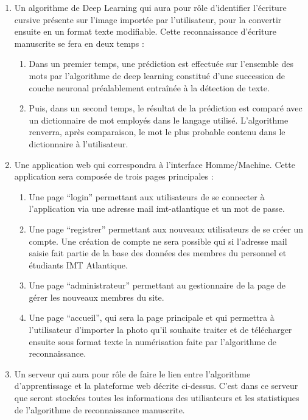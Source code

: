 \documentclass[oneside,a4paper,13pt]{article}
\begin{document}
\begin{enumerate}
    \item Un algorithme de Deep Learning qui aura pour rôle d’identifier l’écriture cursive présente sur l’image importée par l’utilisateur, pour la convertir ensuite en un format texte modifiable. Cette reconnaissance d’écriture manuscrite se fera en deux temps : 
    \begin{enumerate}
        \item Dans un premier temps, une prédiction est effectuée sur l'ensemble des mots par l'algorithme de deep learning constitué d'une succession de couche neuronal préalablement entraînée à la détection de texte.
        \item Puis, dans un second temps, le résultat de la prédiction est comparé avec un dictionnaire de mot employés dans le langage utilisé. L'algorithme renverra, après comparaison, le mot le plus probable contenu dans le dictionnaire à l'utilisateur.   
    \end{enumerate}
    
    \item Une application web qui correspondra à l’interface Homme/Machine. Cette application sera composée  de trois pages principales :
    \begin{enumerate}
        \item Une page “login” permettant aux utilisateurs de se connecter à l’application via une adresse mail imt-atlantique et un mot de passe. 
        \item Une page “registrer” permettant aux nouveaux utilisateurs de se créer un compte. Une création de compte ne sera possible qui si l’adresse mail saisie fait partie de la base des données des membres du personnel et étudiants IMT Atlantique.
        \item Une page “administrateur” permettant au gestionnaire de la page de gérer les nouveaux membres du site. 
        \item Une page “accueil”, qui sera la page principale et qui permettra à l’utilisateur d’importer la photo qu’il souhaite traiter et de télécharger ensuite sous format texte la numérisation faite par l’algorithme de reconnaissance. 
    \end{enumerate}
    
    \item Un serveur qui aura pour rôle de faire le lien entre l’algorithme d’apprentissage et la plateforme web décrite ci-dessus. C’est dans ce serveur que seront stockées toutes les informations des utilisateurs et les statistiques de l'algorithme de reconnaissance manuscrite. 
\end{enumerate}
\end{document}

